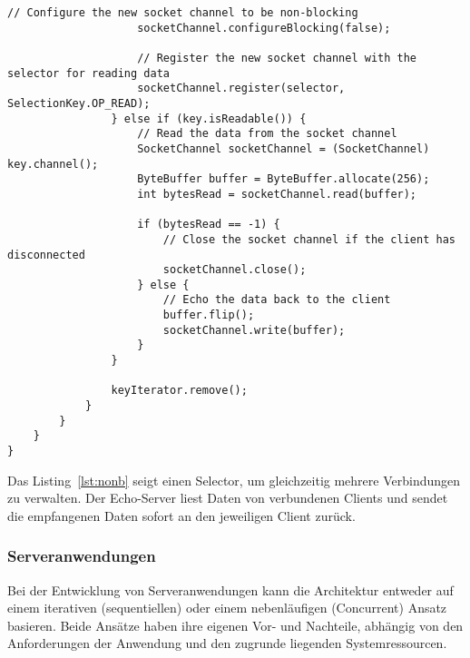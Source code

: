\begin{lstlisting}[caption={Non-Blocking},captionpos=b,label={lst:nonb}]
                    // Configure the new socket channel to be non-blocking
                    socketChannel.configureBlocking(false);

                    // Register the new socket channel with the selector for reading data
                    socketChannel.register(selector, SelectionKey.OP_READ);
                } else if (key.isReadable()) {
                    // Read the data from the socket channel
                    SocketChannel socketChannel = (SocketChannel) key.channel();
                    ByteBuffer buffer = ByteBuffer.allocate(256);
                    int bytesRead = socketChannel.read(buffer);

                    if (bytesRead == -1) {
                        // Close the socket channel if the client has disconnected
                        socketChannel.close();
                    } else {
                        // Echo the data back to the client
                        buffer.flip();
                        socketChannel.write(buffer);
                    }
                }

                keyIterator.remove();
            }
        }
    }
}
\end{lstlisting}
Das Listing~\ref{lst:nonb} seigt einen Selector, um gleichzeitig mehrere Verbindungen zu verwalten. Der Echo-Server liest Daten von verbundenen Clients und sendet die empfangenen Daten sofort an den jeweiligen Client zurück.

\subsubsection{Serveranwendungen}
Bei der Entwicklung von Serveranwendungen kann die Architektur entweder auf einem iterativen (sequentiellen) oder einem nebenläufigen (Concurrent) Ansatz basieren. Beide Ansätze haben ihre eigenen Vor- und Nachteile, abhängig von den Anforderungen der Anwendung und den zugrunde liegenden Systemressourcen. 

